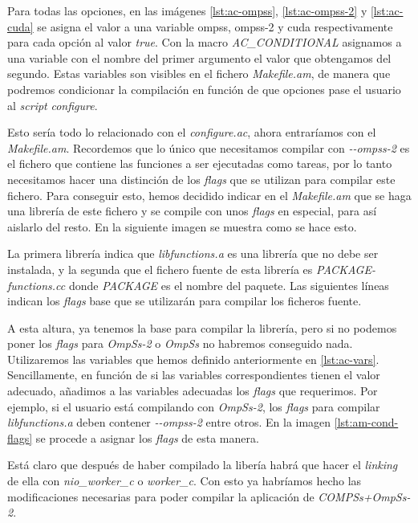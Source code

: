 \bigskip

Para todas las opciones, en las imágenes \ref{lst:ac-ompss}, \ref{lst:ac-ompss-2} y \ref{lst:ac-cuda} se asigna el valor a una variable ompss, ompss-2 y cuda respectivamente para cada opción al valor \textit{true}. Con la macro \textit{AC\_CONDITIONAL} asignamos a una variable con el nombre del primer argumento el valor que obtengamos del segundo. Estas variables son visibles en el fichero \textit{Makefile.am}, de manera que podremos condicionar la compilación en función de que opciones pase el usuario al \textit{script} \textit{configure}.

\bigskip

Esto sería todo lo relacionado con el \textit{configure.ac}, ahora entraríamos con el \textit{Makefile.am}. Recordemos que lo único que necesitamos compilar con \textit{-{}-ompss-2} es el fichero que contiene las funciones a ser ejecutadas como tareas, por lo tanto necesitamos hacer una distinción de los \textit{flags} que se utilizan para compilar este fichero. Para conseguir esto, hemos decidido indicar en el \textit{Makefile.am} que se haga una librería de este fichero y se compile con unos \textit{flags} en especial, para así aislarlo del resto. En la siguiente imagen se muestra como se hace esto.


\bigskip

La primera librería indica que \textit{libfunctions.a} es una librería que no debe ser instalada, y la segunda que el fichero fuente de esta librería es \textit{PACKAGE-functions.cc} donde \textit{PACKAGE} es el nombre del paquete. Las siguientes líneas indican los \textit{flags} base que se utilizarán para compilar los ficheros fuente. 
\smallskip

A esta altura, ya tenemos la base para compilar la librería, pero si no podemos poner los \textit{flags} para \textit{OmpSs-2} o \textit{OmpSs} no habremos conseguido nada. Utilizaremos las variables que hemos definido anteriormente en \ref{lst:ac-vars}. Sencillamente, en función de si las variables correspondientes tienen el valor adecuado, añadimos a las variables adecuadas los \textit{flags} que requerimos. Por ejemplo, si el usuario está compilando con \textit{OmpSs-2}, los \textit{flags} para compilar \textit{libfunctions.a} deben contener \textit{-{}-ompss-2} entre otros. En la imagen \ref{lst:am-cond-flags} se procede a asignar los \textit{flags} de esta manera.

\bigskip

Está claro que después de haber compilado la libería habrá que hacer el \textit{linking} de ella con \textit{nio\_worker\_c} o \textit{worker\_c}. Con esto ya habríamos hecho las modificaciones necesarias para poder compilar la aplicación de \textit{COMPSs+OmpSs-2}.

